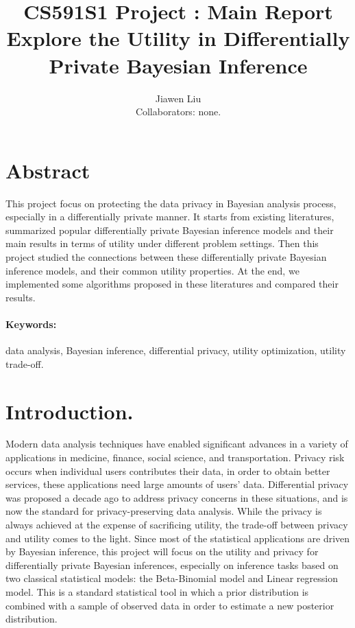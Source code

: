 \documentclass{article}
\begin{document}
\title{
{\textbf{CS591S1 Project
: Main Report}\\
\large{Explore the Utility in Differentially Private Bayesian Inference}}
}
\author{Jiawen Liu\\
Collaborators: none.}

\date{}
\maketitle
\tableofcontents
%
\newpage
%
\section{Abstract}
This project focus on protecting the data privacy in Bayesian analysis process, especially in a differentially private manner.
It starts from existing literatures, summarized popular differentially private Bayesian inference models and their main results in terms of utility under different problem settings.
Then this project studied the connections between these differentially private Bayesian inference models,
and their common utility properties. At the end, we implemented some algorithms proposed in these literatures and compared their results.
%
%
%
\paragraph{Keywords:} data analysis, Bayesian inference, differential privacy, utility optimization, utility trade-off.
%
%
\section{Introduction.}
Modern data analysis techniques have enabled significant
advances in a variety of applications in medicine, finance,
social science, and transportation. Privacy risk occurs when individual users contributes their data, in order to obtain better
services, these applications need large amounts of users’ data. 
Differential privacy was proposed a decade ago to address privacy concerns in these situations, and is now the standard for privacy-preserving data analysis.
While the privacy is always achieved at the expense of sacrificing utility, the trade-off between privacy and utility comes to the light.
Since most of the statistical applications are driven by Bayesian inference, this project will focus on the utility and privacy for differentially private Bayesian inferences, especially on inference tasks based on two classical statistical models: the Beta-Binomial model and Linear regression model.
This is a standard statistical tool in which a prior distribution is combined
with a sample of observed data in order to estimate a new posterior distribution.
\end{document}

